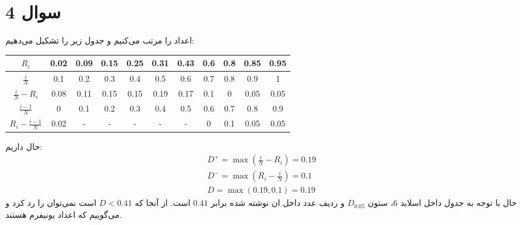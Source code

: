 \section*{سوال 4}
اعداد را مرتب می‌کنیم و جدول زیر را تشکیل می‌دهیم:
\begin{latin}
\centering
\begin{tabular}{|c|c|c|c|c|c|c|c|c|c|c|}
    \hline
    $R_i$ & 0.02 & 0.09 & 0.15 & 0.25 & 0.31 & 0.43 & 0.6 & 0.8 & 0.85 & 0.95\\
    \hline
    $\frac{i}{N}$ & 0.1 & 0.2 & 0.3 & 0.4 & 0.5 & 0.6 & 0.7 & 0.8 & 0.9 & 1\\
    \hline
    $\frac{i}{N} - R_i$ & 0.08 & 0.11 & 0.15 & 0.15 & 0.19 & 0.17 & 0.1 & 0 & 0.05 & 0.05\\
    \hline
    $\frac{i-1}{N}$ & 0 & 0.1 & 0.2 & 0.3 & 0.4 & 0.5 & 0.6 & 0.7 & 0.8 & 0.9\\
    \hline
    $R_i - \frac{i - 1}{N}$ & 0.02 & - & - & - & - & - & 0 & 0.1 & 0.05 & 0.05\\
    \hline
\end{tabular}
\end{latin}
حال داریم:
\begin{gather*}
    D^+ = \max\left(\frac{i}{N}-R_i\right) = 0.19\\
    D^- = \max\left(R_i - \frac{i}{N}\right) = 0.1\\
    D = \max\left(0.19, 0.1\right) = 0.19
\end{gather*}
حال با توجه به جدول داخل اسلاید 6، ستون
$D_{0.05}$
و ردیف
عدد داخل ان نوشته شده برابر
$0.41$
است. از آنجا که
$D < 0.41$
است نمی‌توان
را رد کرد و می‌گوییم که اعداد یونیفرم هستند.